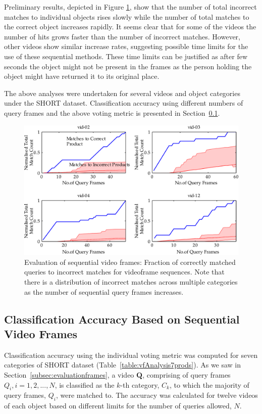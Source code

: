 Preliminary results, depicted in Figure \ref{fig:prd003b}, show that the number of total incorrect matches to individual objects rises slowly while the number of total matches to the correct object increases rapidly. It seems clear that for some of the videos the number of hits grows faster than the number of incorrect matches. However, other videos show similar increase rates, suggesting possible time limits for the use of these sequential methods. These time limits can be justified as after few seconds the object might not be present in the frames as the person holding the object might have returned it to its original place.

The above analyses were undertaken for several videos and object categories under the SHORT dataset. Classification accuracy using different numbers of query frames and the above voting metric is presented in Section~\ref{sec:expResults2}.


\begin{figure}[h!]
\centering
\includegraphics[width=\linewidth]{./gfx/Chapter03/prd0030shadedPlots-4-latex.pdf}
\caption{Evaluation of sequential video frames: Fraction of correctly matched queries to incorrect matches for videoframe sequences. Note that there is a distribution of incorrect matches across multiple categories as the number of sequential query frames increases.}        
\label{fig:prd003b}
\end{figure}


\subsection{Classification Accuracy Based on Sequential Video Frames} \label{sec:expResults2}

Classification accuracy using the individual voting metric was computed for seven categories of SHORT dataset (Table~\ref{table:vfAnalysis7prods}). As we saw in Section~\ref{subsec:evaluationframes}, a video $\mathbf{Q}$, comprising of query frames $Q_i, i = 1,2,...,N$, is classified as the $k$-th category, $C_k$, to which the majority of query frames, $Q_i$, were matched to. The accuracy was calculated for twelve videos of each object based on different limits for the number of queries allowed, $N$.

